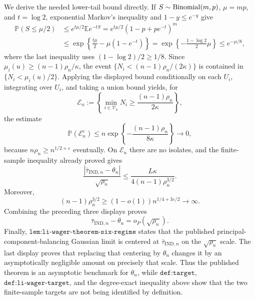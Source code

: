 We derive the needed lower-tail bound directly.  If \(S\sim{\rm Binomial}(m,p)\), \(\mu=mp\), and \(t=\log2\), exponential Markov's inequality and \(1-y\le e^{-y}\) give
\[
\begin{aligned}
\mathbb P(S\le\mu/2)
&\le e^{t\mu/2}\mathbb E e^{-tS}
=e^{t\mu/2}(1-p+pe^{-t})^m\\
&\le\exp\!\left\{\frac{t\mu}{2}-\mu(1-e^{-t})\right\}
=\exp\!\left\{-\frac{1-\log2}{2}\mu\right\}
\le e^{-\mu/8},
\end{aligned}
\]
where the last inequality uses \((1-\log2)/2\ge1/8\).  Since \(\mu_i(u)\ge(n-1)\rho_n/\kappa\), the event \(\{N_i<(n-1)\rho_n/(2\kappa)\}\) is contained in \(\{N_i<\mu_i(u)/2\}\).  Applying the displayed bound conditionally on each \(U_i\), integrating over \(U_i\), and taking a union bound yields, for
\[
\mathcal E_n
:=\left\{\min_{i\in\mathcal V_n}N_i\ge\frac{(n-1)\rho_n}{2\kappa}\right\},
\]
the estimate
\[
\mathbb P(\mathcal E_n^c)
\le n\exp\!\left\{-\frac{(n-1)\rho_n}{8\kappa}\right\}
\longrightarrow0,
\]
because \(n\rho_n\ge n^{1/2+\varepsilon}\) eventually.  On \(\mathcal E_n\) there are no isolates, and the finite-sample inequality already proved gives
\[
\frac{|\bar\tau_{\mathrm{IND},n}-\theta_n|}{\sqrt{\rho_n}}
\le\frac{L\kappa}{4(n-1)\rho_n^{3/2}}.
\]
Moreover,
\[
(n-1)\rho_n^{3/2}
\ge(1-o(1))n^{1/4+3\varepsilon/2}
\longrightarrow\infty.
\]
Combining the preceding three displays proves
\[
\bar\tau_{\mathrm{IND},n}-\theta_n=o_P(\sqrt{\rho_n}).
\]
Finally, \(\texttt{lem:li-wager-theorem-six-regime}\) states that the published principal-component-balancing Gaussian limit is centered at \(\bar\tau_{\mathrm{IND},n}\) on the \(\sqrt{\rho_n}\) scale.  The last display proves that replacing that centering by \(\theta_n\) changes it by an asymptotically negligible amount on precisely that scale.  Thus the published theorem is an asymptotic benchmark for \(\theta_n\), while \(\texttt{def:target}\), \(\texttt{def:li-wager-target}\), and the degree-exact inequality above show that the two finite-sample targets are not being identified by definition.